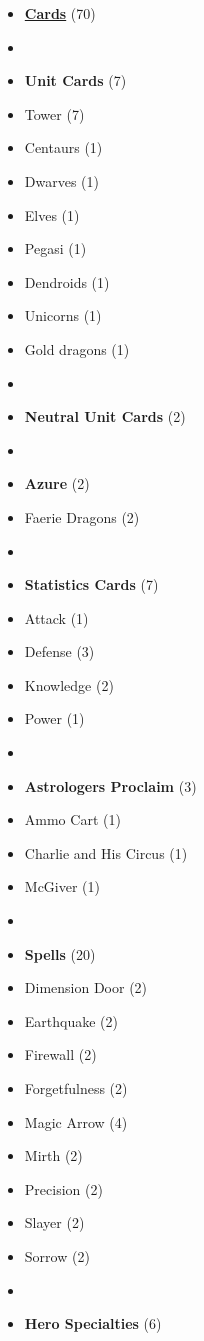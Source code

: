\begin{multicols*}{3}
\begin{itemize}[leftmargin=0pt, label={}, noitemsep, noitemsep]
  \item \textbf{\normalsize{\underline{Cards}}} (70)
  \item
  \item \textbf{Unit Cards} (7)
  \item Tower (7)
  \item Centaurs (1)
  \item Dwarves (1)
  \item Elves (1)
  \item Pegasi (1)
  \item Dendroids (1)
  \item Unicorns (1)
  \item Gold dragons (1)
  \item
  \item \textbf{Neutral Unit Cards} (2)
  \item
  \item \textbf{Azure} (2)
  \item Faerie Dragons (2)
  \item
  \item \textbf{Statistics Cards} (7)
  \item Attack (1)
  \item Defense (3)
  \item Knowledge (2)
  \item Power (1)
  \item
  \item \textbf{Astrologers Proclaim} (3)
  \item Ammo Cart (1)
  \item Charlie and His Circus (1)
  \item McGiver (1)
  \item
  \item \textbf{Spells} (20)
  \item Dimension Door (2)
  \item Earthquake (2)
  \item Firewall (2)
  \item Forgetfulness (2)
  \item Magic Arrow (4)
  \item Mirth (2)
  \item Precision (2)
  \item Slayer (2)
  \item Sorrow (2)
  \item
  \item \textbf{Hero Specialties} (6)

\end{itemize}
\end{multicols*}

